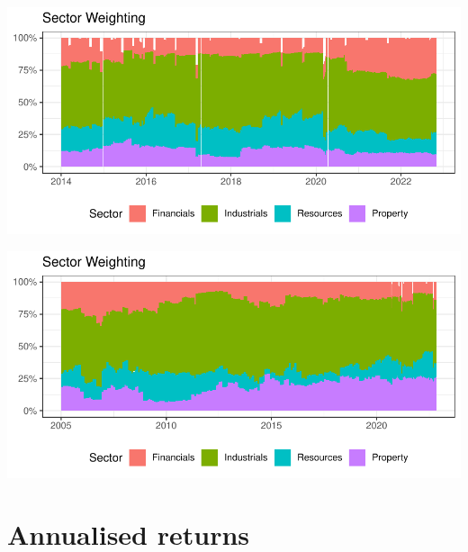 \documentclass[11pt,preprint, authoryear]{elsarticle}
\let\origfigure\figure
\let\endorigfigure\endfigure
\renewenvironment{figure}[1][2] {
    \expandafter\origfigure\expandafter[H]
} {
    \endorigfigure
}
\numberwithin{equation}{section}
\numberwithin{figure}{section}
\numberwithin{table}{section}
\begin{document}
\begin{figure}[H]

{\centering \includegraphics{Volatility-of-Shares_files/figure-latex/Figure5-1} 

}

\caption{Sector weights for Mid Cap index \label{Figure5}}\label{fig:Figure5}
\end{figure}

\begin{figure}[H]

{\centering \includegraphics{Volatility-of-Shares_files/figure-latex/Figure6-1} 

}

\caption{Sector weights for Small Cap index \label{Figure6}}\label{fig:Figure6}
\end{figure}

\hypertarget{annualised-returns}{%
\section{\texorpdfstring{Annualised returns
\label{Returns}}{Annualised returns }}\label{annualised-returns}}
\end{document}

